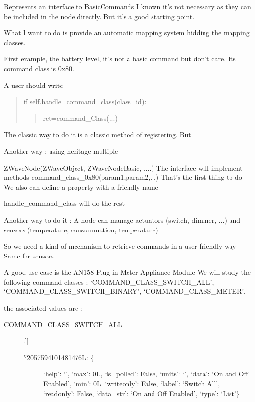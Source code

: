 \documentclass[letterpaper,10pt,english]{sphinxmanual}
\begin{document}
\begin{fulllineitems}
\label{command:openzwave.command.ZWaveNodeBasic}
Represents an interface to BasicCommands
I known it's not necessary as they can be included in the node directly.
But it's a good starting point.

What I want to do is provide an automatic mapping system hidding
the mapping classes.

First example, the battery level, it's not a basic command but don't care.
Its command class is 0x80.

A user should write
\begin{quote}

if self.handle\_command\_class(class\_id):
\begin{quote}

ret=command\_Class(...)
\end{quote}
\end{quote}

The classic way to do it is a classic method of registering. But

Another way : using heritage multiple

ZWaveNode(ZWaveObject, ZWaveNodeBasic, ....)
The interface will implement methods
command\_class\_0x80(param1,param2,...)
That's the first thing to do
We also can define a property with a friendly name

handle\_command\_class will do the rest

Another way to do it :
A node can manage actuators (switch, dimmer, ...)
and sensors (temperature, consummation, temperature)

So we need a kind of mechanism to retrieve commands in a user friendly way
Same for sensors.

A good use case is the AN158 Plug-in Meter Appliance Module
We will study the following command classes :
`COMMAND\_CLASS\_SWITCH\_ALL', `COMMAND\_CLASS\_SWITCH\_BINARY',
`COMMAND\_CLASS\_METER',

the associated values are :
\begin{description}
\item[{COMMAND\_CLASS\_SWITCH\_ALL}] \leavevmode{[}\{{]}\begin{description}
\item[{72057594101481476L: \{}] \leavevmode
`help': `',
`max': 0L,
`is\_polled': False,
`units': `',
`data': `On and Off Enabled',
`min': 0L,
`writeonly': False,
`label': `Switch All',
`readonly': False,
`data\_str': `On and Off Enabled',
`type': `List'\}


\end{description}
\end{description}
\end{fulllineitems}
\end{document}
